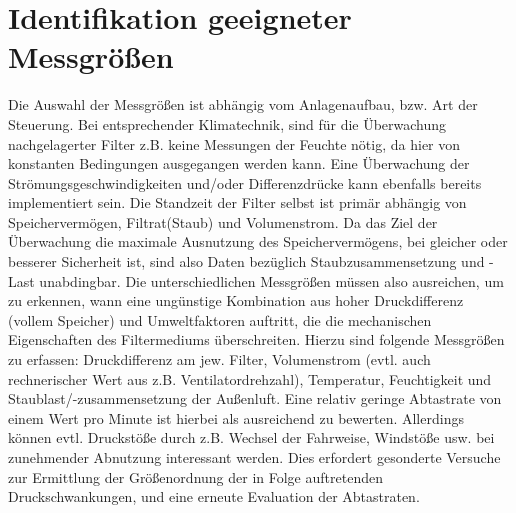     \section{Identifikation geeigneter Messgrößen}
    \label{sec:ident_mess}
    Die Auswahl der Messgrößen ist abhängig vom Anlagenaufbau, bzw. Art der Steuerung. Bei entsprechender Klimatechnik, sind für die Überwachung nachgelagerter Filter z.B. keine Messungen der Feuchte nötig, da hier von konstanten Bedingungen ausgegangen werden kann. Eine Überwachung der Strömungsgeschwindigkeiten und/oder Differenzdrücke kann ebenfalls bereits implementiert sein. \newline
    Die Standzeit der Filter selbst ist primär abhängig von Speichervermögen, Filtrat(Staub) und Volumenstrom. Da das Ziel der Überwachung die maximale Ausnutzung des Speichervermögens, bei gleicher oder besserer Sicherheit ist, sind also Daten bezüglich Staubzusammensetzung und -Last unabdingbar. Die unterschiedlichen Messgrößen müssen also ausreichen, um zu erkennen, wann eine ungünstige Kombination aus hoher Druckdifferenz (vollem Speicher) und Umweltfaktoren auftritt, die die mechanischen Eigenschaften des Filtermediums überschreiten. \newline
    Hierzu sind folgende Messgrößen zu erfassen: Druckdifferenz am jew. Filter, Volumenstrom (evtl. auch rechnerischer Wert aus z.B. Ventilatordrehzahl), Temperatur, Feuchtigkeit und Staublast/-zusammensetzung der Außenluft. Eine relativ geringe Abtastrate von einem Wert pro Minute ist hierbei als ausreichend zu bewerten. Allerdings können evtl. Druckstöße durch z.B. Wechsel der Fahrweise,  Windstöße usw. bei zunehmender Abnutzung interessant werden. Dies erfordert gesonderte Versuche zur Ermittlung der Größenordnung der in Folge auftretenden Druckschwankungen, und eine erneute Evaluation der Abtastraten.
